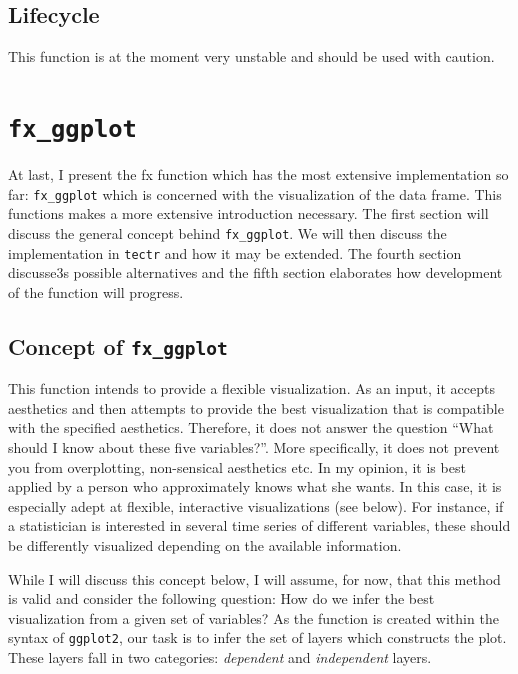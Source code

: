 \documentclass[]{report}
\theoremstyle{definition}
\theoremstyle{definition}
\theoremstyle{definition}
\theoremstyle{remark}
\begin{document}
\subsection{Lifecycle}\label{lifecycle-3}

This function is at the moment very unstable and should be used with
caution.

\section{\texorpdfstring{\texttt{fx\_ggplot}}{fx\_ggplot}}\label{fx-ggplot}

At last, I present the fx function which has the most extensive
implementation so far: \texttt{fx\_ggplot} which is concerned with the
visualization of the data frame. This functions makes a more extensive
introduction necessary. The first section will discuss the general
concept behind \texttt{fx\_ggplot}. We will then discuss the
implementation in \texttt{tectr} and how it may be extended. The fourth
section discusse3s possible alternatives and the fifth section
elaborates how development of the function will progress.

\subsection{\texorpdfstring{Concept of
\texttt{fx\_ggplot}}{Concept of fx\_ggplot}}\label{concept-of-fx_ggplot}

This function intends to provide a flexible visualization. As an input,
it accepts aesthetics and then attempts to provide the best
visualization that is compatible with the specified aesthetics.
Therefore, it does not answer the question ``What should I know about
these five variables?''. More specifically, it does not prevent you from
overplotting, non-sensical aesthetics etc. In my opinion, it is best
applied by a person who approximately knows what she wants. In this
case, it is especially adept at flexible, interactive visualizations
(see below). For instance, if a statistician is interested in several
time series of different variables, these should be differently
visualized depending on the available information.

While I will discuss this concept below, I will assume, for now, that
this method is valid and consider the following question: How do we
infer the best visualization from a given set of variables? As the
function is created within the syntax of \texttt{ggplot2}, our task is
to infer the set of layers which constructs the plot. These layers fall
in two categories: \emph{dependent} and \emph{independent} layers.
\end{document}
